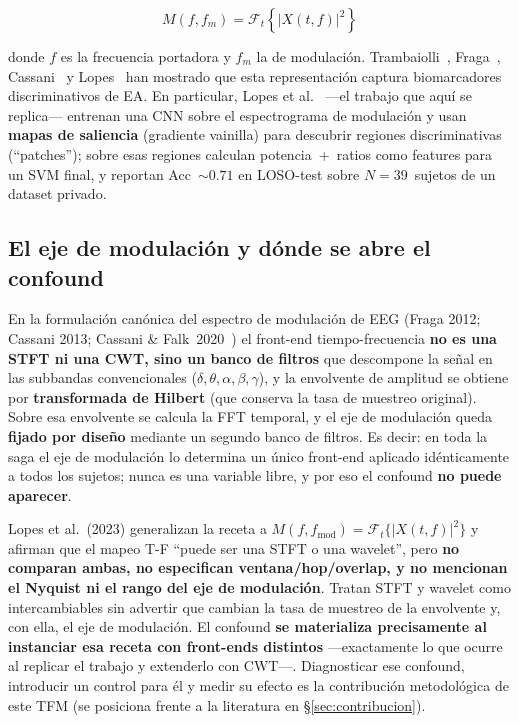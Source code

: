 \documentclass[11pt, a4paper]{article}
\begin{document}
\begin{equation}
    M(f, f_m) = \mathcal{F}_t \left\{ |X(t,f)|^2 \right\}
    \label{eq:modspec}
\end{equation}

\noindent donde $f$ es la frecuencia portadora y $f_m$ la de modulación.
Trambaiolli~\cite{Trambaiolli2011}, Fraga~\cite{Fraga2013},
Cassani~\cite{Cassani2020} y Lopes~\cite{Lopes2023} han mostrado que esta
representación captura biomarcadores discriminativos de EA. En particular,
Lopes et al.~\cite{Lopes2023} ---el trabajo que aquí se replica--- entrenan
una CNN sobre el espectrograma de modulación y usan \textbf{mapas de
saliencia} (gradiente vainilla) para descubrir regiones discriminativas
(``patches''); sobre esas regiones calculan potencia~+~ratios como features
para un SVM final, y reportan Acc~$\sim 0.71$ en LOSO-test sobre
$N=39$~sujetos de un dataset privado.

\subsection{El eje de modulación y dónde se abre el confound}
\label{sec:related}

En la formulación canónica del espectro de modulación de EEG (Fraga 2012;
Cassani 2013; Cassani \& Falk~2020~\cite{Cassani2020}) el front-end
tiempo-frecuencia \textbf{no es una STFT ni una CWT, sino un banco de
filtros} que descompone la señal en las subbandas convencionales
($\delta,\theta,\alpha,\beta,\gamma$), y la envolvente de amplitud se
obtiene por \textbf{transformada de Hilbert} (que conserva la tasa de
muestreo original). Sobre esa envolvente se calcula la FFT temporal, y el
eje de modulación queda \textbf{fijado por diseño} mediante un segundo banco
de filtros. Es decir: en toda la saga el eje de modulación lo determina un
único front-end aplicado idénticamente a todos los sujetos; nunca es una
variable libre, y por eso el confound \textbf{no puede aparecer}.

Lopes et al.~(2023) generalizan la receta a
$M(f, f_{\text{mod}}) = \mathcal{F}_t\{|X(t,f)|^2\}$ y afirman que el mapeo
T-F ``puede ser una STFT o una wavelet'', pero \textbf{no comparan ambas, no
especifican ventana/hop/overlap, y no mencionan el Nyquist ni el rango del
eje de modulación}. Tratan STFT y wavelet como intercambiables sin advertir
que cambian la tasa de muestreo de la envolvente y, con ella, el eje de
modulación. El confound \textbf{se materializa precisamente al instanciar
esa receta con front-ends distintos} ---exactamente lo que ocurre al
replicar el trabajo y extenderlo con CWT---. Diagnosticar ese confound,
introducir un control para él y medir su efecto es la contribución
metodológica de este TFM (se posiciona frente a la literatura en
§\ref{sec:contribucion}).
\end{document}
